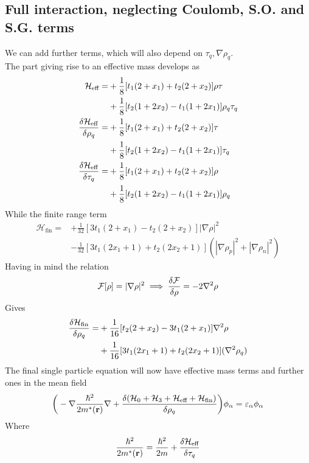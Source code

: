 \subsection{Full interaction, neglecting Coulomb, S.O. and S.G. terms}
We can add further terms, which will also depend on $\tau_q, \nabla\rho_q$.
\\The part giving rise to an effective mass develops as 
\begin{align}
    \mathcal H_\text{eff} = &+\frac 1 8 [t_1(2+x_1)+t_2(2+x_2)]\rho\tau  \\&+ \frac 1 8 [t_2(1+2x_2)-t_1(1+2x_1)]\rho_q\tau_q
    \\\fdv{\mathcal H_\text{eff}}{\rho_q} =&+ \frac 1 8 [t_1(2+x_1)+t_2(2+x_2)]\tau \\& + \frac 1 8 [t_2(1+2x_2)-t_1(1+2x_1)]\tau_q
    \\\fdv{\mathcal H_\text{eff}}{\tau_q} =&+ \frac 1 8 [t_1(2+x_1)+t_2(2+x_2)]\rho\\ &+ \frac 1 8 [t_2(1+2x_2)-t_1(1+2x_1)]\rho_q
    \end{align}
While the finite range term 
\begin{align}
    \mathcal H_\text{fin} = &+\frac 1 {32} [3t_1(2+x_1)-t_2(2+x_2)] | \nabla\rho|^2 \\&- \frac 1 {32} [3t_1(2x_1+1)+t_2(2x_2+1)] ( |\nabla\rho_p| ^2 + |\nabla\rho_n|^2) 
\end{align}
Having in mind the relation 
\[\mathcal F [\rho] = |\nabla\rho|^2 \implies \fdv {\mathcal F} {\rho} = -2\nabla^2 \rho\]
Gives
\begin{align}
    \fdv{\mathcal H_\text{fin}}{\rho_q} = &+ \frac 1 {16} [t_2(2+x_2)-3t_1(2+x_1)] \nabla^2 \rho \\&+ \frac 1 {16} [3t_1(2x_1+1)+t_2(2x_2+1)] ( \nabla^2 \rho_q )
\end{align}
The final single particle equation will now have effective mass terms and further ones in the mean field
\begin{align}
    \bigg(-\nabla \frac {\hbar^2}{2m^*(\mathbf r)} \nabla + \fdv{(\mathcal{H}_0 + \mathcal{H}_3 + \mathcal{H}_\text{eff} + \mathcal{H}_\text{fin})}{\rho_q} \bigg)\phi_\alpha = \varepsilon_\alpha\phi_\alpha
\end{align}
Where 
\[\frac{\hbar^2}{2m^*(\mathbf r)} = \frac{\hbar^2}{2m} + \fdv{\mathcal{H}_\text{eff}}{\tau_q}\]
